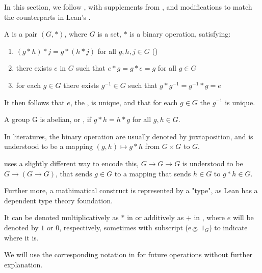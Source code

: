 
In this section, we follow \cite{jadczyk2019notes}, with supplements from \cite{garling2011clifford, chen2016infinitely}, 
and modifications to match the counterparts in Lean's \Mathlib.

\begin{definition}[Group]
    \label{Group}
    \leanok

    A  is a pair $(G, *)$, where $G$ is a set, $*$ is a binary operation, satisfying:

    \begin{enumerate}
    \item $(g * h) * j = g * (h * j)$ for all $g, h, j \in G$ ()
    \item there exists $e$ in $G$ such that $e * g = g * e = g$ for all $g \in G$
    \item for each $g \in G$ there exists $g^{-1} \in G$ such that $g * g^{-1} = g^{-1} * g = e$

    \end{enumerate}

\end{definition}

\begin{remark}
    \label{mk:Group}
    
    It then follows that $e$, the , is unique, and that for each $g \in G$ the  $g^{-1}$ is unique.

    A group G is abelian, or , if $g * h = h * g$ for all $g, h \in G$.

\end{remark}

\begin{remark}
    \label{mk:Notation}

    In literatures, the binary operation are usually denoted by juxtaposition, and is understood to be a mapping
    $(g, h) \mapsto g * h$ from $G \times G$ to $G$.
    
    \Mathlib uses a slightly different way to encode this, $G \to G \to G$ is understood to be $G \to (G \to G)$,
    that sends $g \in G$ to a mapping that sends $h \in G$ to $g * h \in G$.
    
    Further more, a mathimatical construct is represented by a "type", as Lean has a dependent type theory foundation. %
    
    It can be denoted multiplicatively as $*$ in 
    or additively as $+$ in , where $e$ will be denoted by $1$ or $0$, respectively,
    sometimes with subscript (e.g. $1_G$) to indicate where it is.

    We will use the corresponding notation in \Mathlib for future operations without further explanation.

\end{remark}

